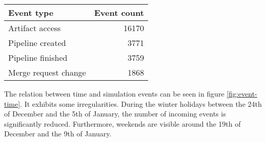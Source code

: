    \begin{Figure}
        \begin{center}
            \begin{tabular}{ l | r }
                Event type & Event count \\ \hline
                Artifact access & 16170 \\
                Pipeline created & 3771 \\
                Pipeline finished & 3759 \\
                Merge request change & 1868 \\
            \end{tabular}
        \end{center}
        \label{tbl:simulation-event-overview}
    \end{Figure}
    
    \pagebreak
    
    
    The relation between time and simulation events can be seen in figure \ref{fig:event-time}. It exhibits some irregularities. During the winter holidays between the 24th of December and the 5th of January, the number of incoming events is significantly reduced. Furthermore, weekends are visible around the 19th of December and the 9th of January.
    
    
